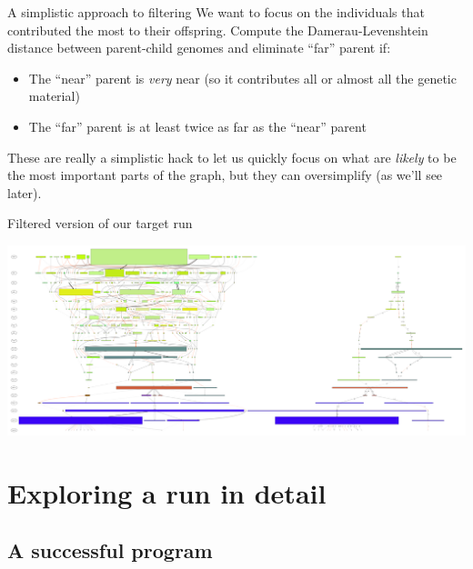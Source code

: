 \documentclass{beamer}
\newcommand{\linespace}{\vskip 0.25cm}
\begin{document}
\begin{frame}{A simplistic approach to filtering}
	We want to focus on the individuals that contributed the most to their offspring.
	\linespace
	Compute the Damerau-Levenshtein distance between parent-child genomes and eliminate ``far'' parent if:
	\begin{itemize}
		\item The ``near'' parent is \emph{very} near (so it contributes all or almost all the genetic material)
		\item The ``far'' parent is at least twice as far as the ``near'' parent
	\end{itemize}
	These are really a simplistic hack to let us quickly focus on what are \emph{likely} to be the most important parts of the graph, but they can oversimplify (as we'll see later).
\end{frame}

\begin{frame}{Filtered version of our target run}
	\begin{center}
		\includegraphics[width=\linewidth]{../../figures/run0_RBM_color_filtered_and_full_30000}
	\end{center}
\end{frame}

\section{Exploring a run in detail}

\subsection{A successful program}
\end{document}
